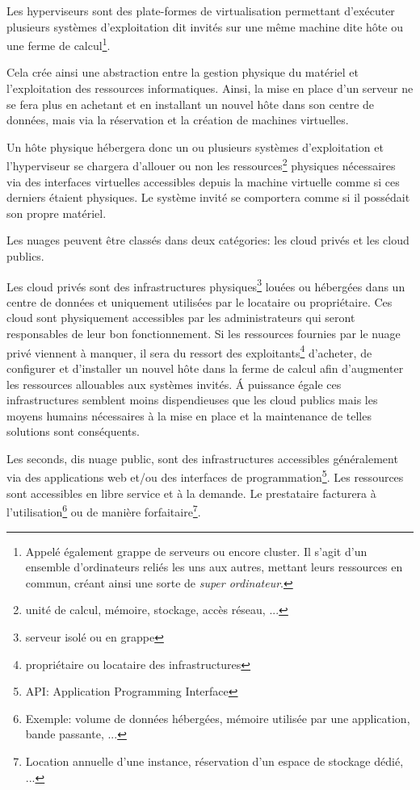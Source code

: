 \documentclass[11pt, a4paper ]{article}
\begin{document}
\begin{spacing}{1.5}
Les hyperviseurs sont des plate-formes de virtualisation permettant d’exécuter plusieurs systèmes d'exploitation dit invités sur une même machine dite hôte ou une ferme de calcul\footnote{Appelé également grappe de serveurs ou encore cluster. Il s'agit d'un ensemble d'ordinateurs reliés les uns aux autres, mettant leurs ressources en commun, créant ainsi une sorte de \emph{super ordinateur}. }.

Cela crée ainsi une abstraction entre la gestion physique du matériel et l'exploitation des ressources informatiques. Ainsi, la mise en place d'un serveur ne se fera plus en achetant et en installant un nouvel hôte dans son centre de données, mais via la réservation et la création de machines virtuelles.

Un hôte physique hébergera donc un ou plusieurs systèmes d'exploitation et l'hyperviseur se chargera d'allouer ou non les ressources\footnote{unité de calcul, mémoire, stockage, accès réseau, ...}  physiques nécessaires via des interfaces virtuelles accessibles depuis la machine virtuelle comme si ces derniers étaient physiques. Le système invité se comportera comme si il possédait son propre matériel.

Les nuages peuvent être classés dans deux catégories: les cloud privés et les cloud publics.


Les cloud privés sont des infrastructures physiques\footnote{serveur isolé ou en grappe} louées ou hébergées dans un centre de données et uniquement utilisées par le locataire ou propriétaire. Ces cloud sont physiquement accessibles par les administrateurs qui seront responsables de leur bon fonctionnement. Si les ressources fournies par le nuage privé viennent à manquer, il sera du ressort des exploitants\footnote{propriétaire ou locataire des infrastructures} d'acheter, de configurer et d'installer un nouvel hôte dans la ferme de calcul afin d'augmenter les ressources allouables aux systèmes invités. Á puissance égale ces infrastructures semblent moins dispendieuses que les cloud publics mais les moyens humains nécessaires à la mise en place et la maintenance de telles solutions sont conséquents.

Les seconds, dis nuage public, sont des infrastructures accessibles généralement via des applications web et/ou des interfaces de programmation\footnote{API: Application Programming Interface}. Les ressources sont accessibles en libre service et à la demande. Le prestataire facturera à l'utilisation\footnote{Exemple: volume de données hébergées, mémoire utilisée par une application, bande passante, ...} ou de manière forfaitaire\footnote{Location annuelle d'une instance, réservation d'un espace de stockage dédié, ...}.


\end{spacing}
\end{document}

